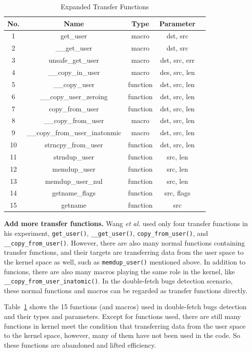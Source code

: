 \documentclass[10pt]{llncs}
\begin{document}
\begin{table}[t!]
\caption{Expanded Transfer Functions}
\centering
\begin{tabular}{ccccc} 
  \hline
  \textbf{No.} & \textbf{Name} & \textbf{Type} & \textbf{Parameter} \\
  \hline
  1 & get\_user & macro & dst, src \\
  2 & \_\_get\_user & macro & dst, src \\
  3 & unsafe\_get\_user & macro & dst, src, err \\
  4 & \_\_copy\_in\_user & macro & des, src, len \\
  5 & \_\_copy\_user & function & dst, src, len \\
  6 & \_\_copy\_user\_zeroing & function & dst, src, len \\
  7 & copy\_from\_user & function & dst, src, len \\
  8 & \_\_copy\_from\_user & macro & dst, src, len \\
  9 & \_\_copy\_from\_user\_inatonmic & macro & dst, src, len \\
  10 & strncpy\_from\_user & function & dst, src, len \\
  11 & strndup\_user & function & src, len \\
  12 & memdup\_user & function & src, len \\
  13 & memdup\_user\_nul & function & src, len \\
  14 & getname\_flags & function & src, flags \\
  15 & getname & function & src \\
  \hline
\end{tabular}
\label{transfer-func}
\end{table}

\textbf{Add more transfer functions.} Wang \textit{et al.} used only four transfer functions in his experiment, \verb:get_user():, \verb:__get_user():, \verb:copy_from_user():, and \verb:__copy_from_user():. However, there are also many normal functions containing transfer functions, and their targets are transferring data from the user space to the kernel space as well, such as \verb:memdup_user(): mentioned above. In addition to funcions, there are also many macros playing the same role in the kernel, like \verb:__copy_from_user_inatomic():.
In the double-fetch bugs detection scenario, these normal functions and macros can be regarded as transfer functions directly. 

Table~\ref{transfer-func} shows the 15 functions (and macros) used in double-fetch bugs detection and their types and parameters. Except for functions used, there are still many functions in kernel meet the condition that transferring data from the user space to the kernel space, however, many of them have not been used in the code. So these functions are abandoned and lifted efficiency.
\end{document}
